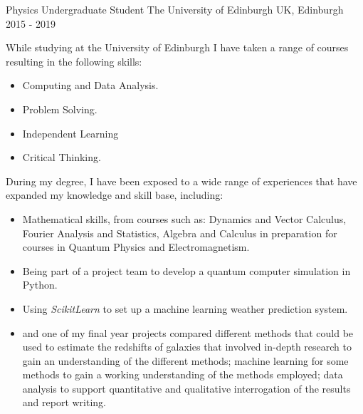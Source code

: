 \begin{cventries}
 \cventry
    {Physics Undergraduate Student} %
    {The University of Edinburgh} %
    {UK, Edinburgh} %
    {2015 - 2019} %
    {
      While studying at the University of Edinburgh I have taken a range of courses resulting in the following skills: 
      \begin{itemize}
          \item Computing and Data Analysis.
          \item Problem Solving.
          \item Independent Learning
          \item Critical Thinking.
      \end{itemize}
      During my degree, I have been exposed to a wide range of experiences that have expanded my knowledge and skill base, including:
      \begin{itemize}
          \item Mathematical skills, from courses such as: Dynamics and Vector Calculus, Fourier Analysis and Statistics, Algebra and Calculus in preparation for courses in Quantum Physics and Electromagnetism.
          \item Being part of a project team to develop a quantum computer simulation in Python.
          \item Using \textit{ScikitLearn} to set up a machine learning weather prediction system.
          \item and one of my final year projects compared different methods that could be used to estimate the redshifts of galaxies that involved in-depth research to gain an understanding of the different methods; machine learning for some methods to gain a working understanding of the methods employed; data analysis to support quantitative and qualitative interrogation of the results and report writing.
      \end{itemize}
      }
      


\end{cventries}
